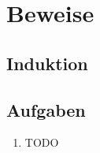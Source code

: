 \chapter{Beweise}

\section{Induktion}

\section{Aufgaben}
\begin{enumerate}
\item TODO
\end{enumerate}
